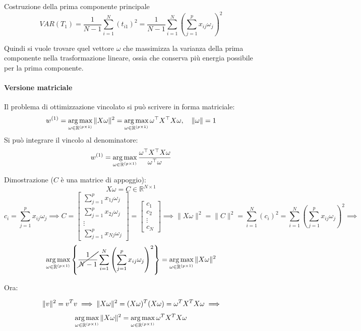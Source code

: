 \begin{mybox2}{Costruzione della prima componente principale}
		$$
		VAR(T_1) = \frac{1}{N-1} \sum_{i=1}^{N} (t_{i1})^2 = \frac{1}{N-1} \sum_{i=1}^{N} \left( \sum_{j=1}^{p} x_{ij} \omega_j \right)^2
		$$
		
		Quindi si vuole trovare quel vettore $\omega$ che massimizza la varianza della prima componente nella trasformazione lineare, ossia che conserva più energia possibile per la prima componente.
	\end{mybox2}
	
	
	\paragraph{Versione matriciale}
	
	\begin{mybox}
		Il problema di ottimizzazione vincolato si può scrivere in forma matriciale:
		$$
		w^{(1)} = \operatorname*{arg\,max}_{\omega \in \mathbb{R}^{(p\times1)}} \| X \omega \|^2 = \operatorname*{arg\,max}_{\omega \in \mathbb{R}^{(p\times1)}} \omega^\top X^\top X \omega,\quad \|\omega\|=1
		$$
		Si può integrare il vincolo al denominatore:
		$$
		w^{(1)} = \operatorname*{arg\,max}_{\omega \in \mathbb{R}^{(p\times1)}} \frac{\omega^\top X^\top X \omega}{\omega^\top \omega}
		$$
	\end{mybox}
	
	Dimostrazione ($C$ è una matrice di appoggio):
	$$
	X\omega = C \in \mathbb{R}^{N \times 1}
	$$
	$$
	c_i = \sum_{j=1}^{p} x_{ij} \omega_j \implies C = \begin{bmatrix} \sum_{j=1}^{p} x_{1j} \omega_j \\ \sum_{j=1}^{p} x_{2j} \omega_j \\ \vdots \\ \sum_{j=1}^{p} x_{Nj} \omega_j \end{bmatrix} = \begin{bmatrix} c_1 \\ c_2 \\ \vdots \\ c_N \end{bmatrix}\implies
	\|X\omega\|^2 = \|C\|^2 = \sum_{i=1}^{N} (c_i)^2 = \sum_{i=1}^{N} \left( \sum_{j=1}^{p} x_{ij} \omega_j \right)^2\implies
	$$
	$$
	\operatorname*{arg\,max}_{\omega\in \mathbb{R}^{(p\times1)}} \left\{ \cancel{\frac{1}{N-1}} \sum_{i=1}^{N} \left( \sum_{j=1}^{p} x_{ij} \omega_j \right)^2 \right\}=\operatorname*{arg\,max}_{\omega \in \mathbb{R}^{(p\times1)}} \| X \omega \|^2
	$$
	
	Ora:
	
	$$
	\|v\|^2=v^Tv\implies\|X\omega\|^2 = (X\omega)^T (X\omega)=\omega^TX^T X\omega\implies\\[.2cm]
	$$
	$$
	\operatorname*{arg\,max}_{\omega \in \mathbb{R}^{(p\times1)}} \| X \omega \|^2=\operatorname*{arg\,max}_{\omega \in \mathbb{R}^{(p\times1)}}\omega^TX^T X\omega
	$$
	

